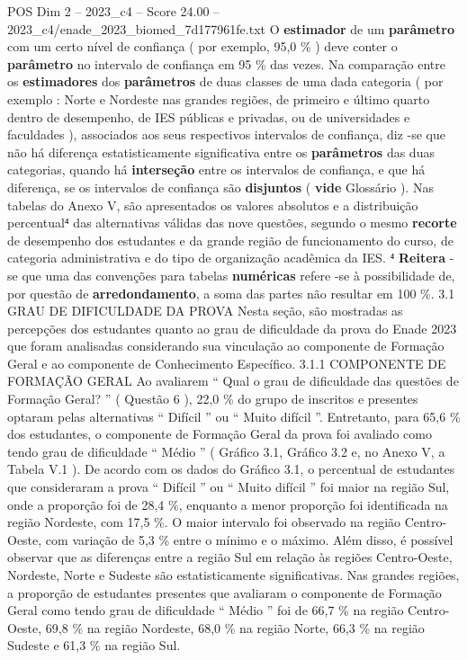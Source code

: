 \begin{textsample}{POS Dim 2 – 2023\_c4 – Score 24.00 – 2023\_c4/enade\_2023\_biomed\_7d177961fe.txt}
O \textbf{estimador} de um \textbf{parâmetro} com um certo nível de confiança ( por exemplo, 95,0 \% ) deve conter o \textbf{parâmetro} no intervalo de confiança em 95 \% das vezes.
Na comparação entre os \textbf{estimadores} dos \textbf{parâmetros} de duas classes de uma dada categoria ( por exemplo : Norte e Nordeste nas grandes regiões, de primeiro e último quarto dentro de desempenho, de IES públicas e privadas, ou de universidades e faculdades ), associados aos seus respectivos intervalos de confiança, diz -se que não há diferença estatisticamente significativa entre os \textbf{parâmetros} das duas categorias, quando há \textbf{interseção} entre os intervalos de confiança, e que há diferença, se os intervalos de confiança são \textbf{disjuntos} ( \textbf{vide} Glossário ).
Nas tabelas do Anexo V, são apresentados os valores absolutos e a distribuição percentual⁴ das alternativas válidas das nove questões, segundo o mesmo \textbf{recorte} de desempenho dos estudantes e da grande região de funcionamento do curso, de categoria administrativa e do tipo de organização acadêmica da IES. ⁴ \textbf{Reitera} -se que uma das convenções para tabelas \textbf{numéricas} refere -se à possibilidade de, por questão de \textbf{arredondamento}, a soma das partes não resultar em 100 \%. 3.1 GRAU DE DIFICULDADE DA PROVA Nesta seção, são mostradas as percepções dos estudantes quanto ao grau de dificuldade da prova do Enade 2023 que foram analisadas considerando sua vinculação ao componente de Formação Geral e ao componente de Conhecimento Específico. 3.1.1 COMPONENTE DE FORMAÇÃO GERAL Ao avaliarem “ Qual o grau de dificuldade das questões de Formação Geral? ” ( Questão 6 ), 22,0 \% do grupo de inscritos e presentes optaram pelas alternativas “ Difícil ” ou “ Muito difícil ”.
Entretanto, para 65,6 \% dos estudantes, o componente de Formação Geral da prova foi avaliado como tendo grau de dificuldade “ Médio ” ( Gráfico 3.1, Gráfico 3.2 e, no Anexo V, a Tabela V.1 ).
De acordo com os dados do Gráfico 3.1, o percentual de estudantes que consideraram a prova “ Difícil ” ou “ Muito difícil ” foi maior na região Sul, onde a proporção foi de 28,4 \%, enquanto a menor proporção foi identificada na região Nordeste, com 17,5 \%.
O maior intervalo foi observado na região Centro-Oeste, com variação de 5,3 \% entre o mínimo e o máximo.
Além disso, é possível observar que as diferenças entre a região Sul em relação às regiões Centro-Oeste, Nordeste, Norte e Sudeste são estatisticamente significativas.
Nas grandes regiões, a proporção de estudantes presentes que avaliaram o componente de Formação Geral como tendo grau de dificuldade “ Médio ” foi de 66,7 \% na região Centro-Oeste, 69,8 \% na região Nordeste, 68,0 \% na região Norte, 66,3 \% na região Sudeste e 61,3 \% na região Sul.

\end{textsample}
